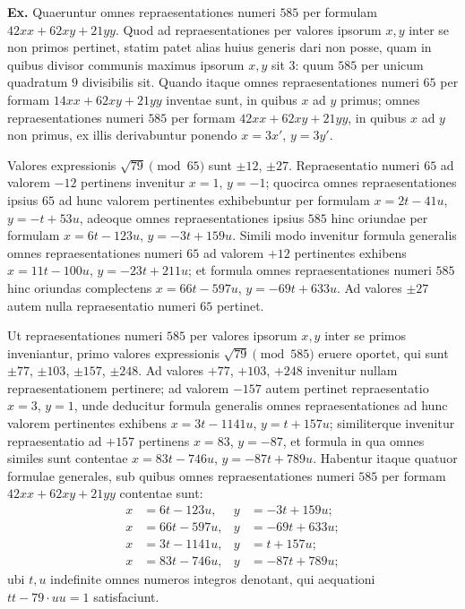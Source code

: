 \documentclass[12pt,a4paper]{article}
\theoremstyle{plain}
\theoremstyle{definition}
\theoremstyle{remark}
\begin{document}
\textbf{Ex.} Quaeruntur omnes repraesentationes numeri $585$ per formulam $42xx+62xy+21yy$. Quod ad repraesentationes per valores ipsorum $x,y$ inter se non primos pertinet, statim patet alias huius generis dari non posse, quam in quibus divisor communis maximus ipsorum $x,y$ sit $3$: quum $585$ per unicum quadratum $9$ divisibilis sit. Quando itaque omnes repraesentationes numeri $65$ per formam $14xx+62xy+21yy$ inventae sunt, in quibus $x$ ad $y$ primus; omnes repraesentationes numeri $585$ per formam $42xx+62xy+21yy$, in quibus $x$ ad $y$ non primus, ex illis derivabuntur ponendo $x=3x'$, $y=3y'$.

Valores expressionis $\sqrt{79}\pmod{65}$ sunt $\pm12$, $\pm27$. Repraesentatio numeri $65$ ad valorem $-12$ pertinens invenitur $x=1$, $y=-1$; quocirca omnes repraesentationes ipsius $65$ ad hunc valorem pertinentes exhibebuntur per formulam $x=2t-41u$, $y=-t+53u$, adeoque omnes repraesentationes ipsius $585$ hinc oriundae per formulam $x=6t-123u$, $y=-3t+159u$. Simili modo invenitur formula generalis omnes repraesentationes numeri $65$ ad valorem $+12$ pertinentes exhibens $x=11t-100u$, $y=-23t+211u$; et formula omnes repraesentationes numeri $585$ hinc oriundas complectens $x=66t-597u$, $y=-69t+633u$. Ad valores $\pm27$ autem nulla repraesentatio numeri $65$ pertinet.

Ut repraesentationes numeri $585$ per valores ipsorum $x,y$ inter se primos inveniantur, primo valores expressionis $\sqrt{79}\pmod{585}$ eruere oportet, qui sunt $\pm77$, $\pm103$, $\pm157$, $\pm248$. Ad valores $+77$, $+103$, $+248$ invenitur nullam repraesentationem pertinere; ad valorem $-157$ autem pertinet repraesentatio $x=3$, $y=1$, unde deducitur formula generalis omnes repraesentationes ad hunc valorem pertinentes exhibens $x=3t-1141u$, $y=t+157u$; similiterque invenitur repraesentatio ad $+157$ pertinens $x=83$, $y=-87$, et formula in qua omnes similes sunt contentae $x=83t-746u$, $y=-87t+789u$. Habentur itaque quatuor formulae generales, sub quibus omnes repraesentationes numeri $585$ per formam $42xx+62xy+21yy$ contentae sunt:
\begin{align*}
x&=6t-123u, & y&=-3t+159u;\\
x&=66t-597u, & y&=-69t+633u;\\
x&=3t-1141u, & y&=t+157u;\\
x&=83t-746u, & y&=-87t+789u;
\end{align*}
ubi $t,u$ indefinite omnes numeros integros denotant, qui aequationi $tt-79\cdot uu=1$ satisfaciunt.
\end{document}
